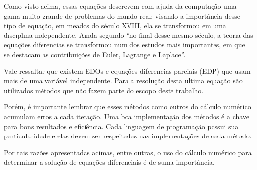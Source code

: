 Como visto acima, essas equações descrevem com ajuda da computação
uma gama muito grande de problemas do mundo real; visando a importância
desse tipo de equação, em meados do século XVIII, ela se transformou em
uma disciplina independente. Ainda segundo  ``no final desse 
mesmo século, a teoria das equações diferencias se transformou num
dos estudos mais importantes, em que se destacam as contribuições de 
Euler, Lagrange e Laplace''.

Vale ressaltar que existem EDOs e
equações diferencias parciais (EDP) que usam mais de uma variável
independente. Para a resolução desta ultima equação são utilizados
métodos que não fazem parte do escopo deste trabalho.
 
Porém, é importante lembrar que esses métodos
como outros do cálculo numérico acumulam erros a cada iteração.
Uma boa implementação dos métodos é a chave para bons resultados
e eficiência. Cada linguagem de programação possui sua particularidade
e elas devem ser respeitadas nas implementações de cada método. 

Por tais razões apresentadas acimas, entre outras, o uso do cálculo
numérico para determinar a solução de equações diferenciais 
é de suma importância.
